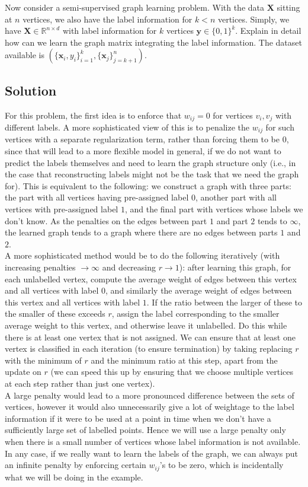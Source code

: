 \documentclass[a4paper]{article}
\newcommand{\nl}{\vspace{0.2cm}\\}
\newcommand{\mf}{\mathbf}
\newcommand{\R}{\mathbb{R}}
\begin{document}
Now consider a semi-supervised graph learning problem. With the data $\mf{X}$ sitting at $n$ vertices, we also have the label information for $k < n$ vertices. Simply, we have $\mf{X} \in \R^{n \times
d}$ with label information for $k$ vertices $\mf{y} \in \{0, 1\}^k$. Explain in detail how can we learn the graph matrix integrating the label information. The dataset available is
$\left(\{\mf{x}_i, y_i\}_{i = 1}^k, \{\mf{x}_j\}_{j = k + 1}^n\right)$.

\subsection{Solution}

For this problem, the first idea is to enforce that $w_{ij} = 0$ for vertices $v_i, v_j$ with different labels. A more sophisticated view of this is to penalize the $w_{ij}$ for such vertices
with a separate regularization term, rather than forcing them to be $0$, since that will lead to a more flexible model in general, if we do not want to predict the labels themselves and
need to learn the graph structure only (i.e., in the case that reconstructing labels might not be the task that we need the graph for). This is equivalent to the following: we construct a graph with
three parts: the part with all vertices having pre-assigned label $0$, another part with all vertices with pre-assigned label $1$, and the final part with vertices whose labels we don't know. As the
penalties on the edges between part $1$ and part $2$ tends to $\infty$, the learned graph tends to a graph where there are no edges between parts $1$ and $2$.\nl
A more sophisticated method would be to do the following iteratively (with increasing penalties $\to \infty$ and decreasing $r \to 1$): after learning this graph, for each unlabelled vertex, compute
the average weight of edges between this vertex and all vertices with label $0$, and similarly the average weight of edges between this vertex and all vertices with label $1$. If the ratio between
the larger of these to the smaller of these exceeds $r$, assign the label corresponding to the smaller average weight to this vertex, and otherwise leave it unlabelled. Do this while
there is at least one vertex that is not assigned.
We can ensure that at least one vertex is classified in each iteration (to ensure termination) by taking replacing $r$ with the minimum of $r$ and the minimum ratio at this step, apart from the
update on $r$ (we can speed this up by ensuring that we choose multiple vertices at each step rather than just one vertex).\nl
A large penalty would lead to a more pronounced difference between the sets of vertices, however it would also unnecessarily give a lot of weightage to the label information if it were to be
used at a point in time when we don't have a sufficiently large set of labelled points. Hence we will use a large penalty only when there is a small number of vertices whose label information is not
available. In any case, if we really want to learn the labels of the graph, we can always put an infinite penalty by enforcing certain $w_{ij}$'s to be zero, which is incidentally what we will be
doing in the example.
\end{document}
